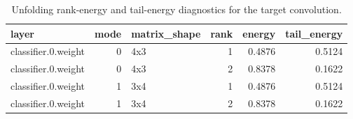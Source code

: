 \begin{table}
\caption{Unfolding rank-energy and tail-energy diagnostics for the target convolution.}
\label{tab:rank-energy}
\begin{tabular}{lrlrrr}
\toprule
layer & mode & matrix\_shape & rank & energy & tail\_energy \\
\midrule
classifier.0.weight & 0 & 4x3 & 1 & 0.4876 & 0.5124 \\
classifier.0.weight & 0 & 4x3 & 2 & 0.8378 & 0.1622 \\
classifier.0.weight & 1 & 3x4 & 1 & 0.4876 & 0.5124 \\
classifier.0.weight & 1 & 3x4 & 2 & 0.8378 & 0.1622 \\
\bottomrule
\end{tabular}
\end{table}
